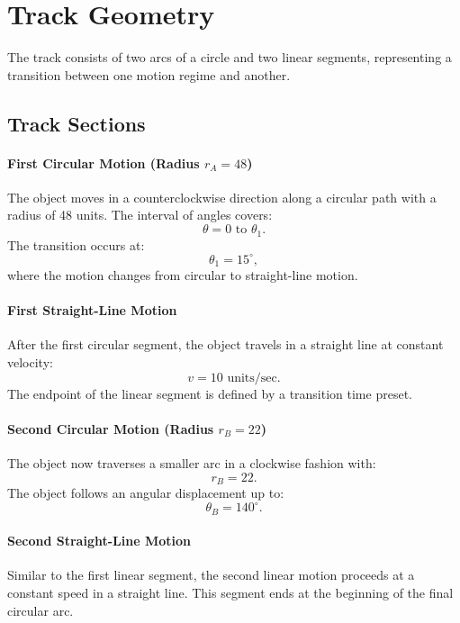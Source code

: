 \documentclass[a4paper,11pt]{article}
\begin{document}
\section*{Track Geometry}
The track consists of two arcs of a circle and two linear segments, representing a transition between one motion regime and another.

\subsection*{Track Sections}

\paragraph{First Circular Motion (Radius $r_A = 48$)}
The object moves in a counterclockwise direction along a circular path with a radius of 48 units. The interval of angles covers:
\begin{equation}
\theta = 0 \text{ to } \theta_1.
\end{equation}
The transition occurs at:
\begin{equation}
\theta_1 = 15^\circ,
\end{equation}
where the motion changes from circular to straight-line motion.

\paragraph{First Straight-Line Motion}
After the first circular segment, the object travels in a straight line at constant velocity:
\begin{equation}
v = 10 \text{ units/sec}.
\end{equation}
The endpoint of the linear segment is defined by a transition time preset.

\paragraph{Second Circular Motion (Radius $r_B = 22$)}
The object now traverses a smaller arc in a clockwise fashion with:
\begin{equation}
r_B = 22.
\end{equation}
The object follows an angular displacement up to:
\begin{equation}
\theta_B = 140^\circ.
\end{equation}

\paragraph{Second Straight-Line Motion}
Similar to the first linear segment, the second linear motion proceeds at a constant speed in a straight line. This segment ends at the beginning of the final circular arc.
\end{document}
